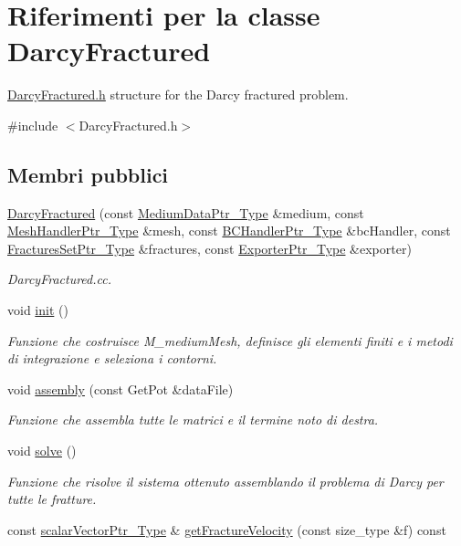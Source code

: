\hypertarget{classDarcyFractured}{\section{Riferimenti per la classe Darcy\-Fractured}
\label{classDarcyFractured}
}


\hyperlink{DarcyFractured_8h}{Darcy\-Fractured.\-h} structure for the Darcy fractured problem.  




{\ttfamily \#include $<$Darcy\-Fractured.\-h$>$}

\subsection*{Membri pubblici}
\begin{DoxyCompactItemize}
\item 
\hyperlink{classDarcyFractured_accc03f979ab787754e26d9f06b553c96}{Darcy\-Fractured} (const \hyperlink{MediumData_8h_ab4e5446269b79f019405fbe1b6e4b1fe}{Medium\-Data\-Ptr\-\_\-\-Type} \&medium, const \hyperlink{MeshHandler_8h_a1e5fc39dfda19e81b21756ab7719ef4c}{Mesh\-Handler\-Ptr\-\_\-\-Type} \&mesh, const \hyperlink{BCHandler_8h_aa175884cb453788647f17f2230a2a762}{B\-C\-Handler\-Ptr\-\_\-\-Type} \&bc\-Handler, const \hyperlink{FracturesSet_8h_ac29a2a91d3af77fb459980a7db47f420}{Fractures\-Set\-Ptr\-\_\-\-Type} \&fractures, const \hyperlink{Exporter_8h_ac9d7f94fea8b91459a536bfaa2f3910c}{Exporter\-Ptr\-\_\-\-Type} \&exporter)
\begin{DoxyCompactList}\small\item\em Darcy\-Fractured.\-cc. \end{DoxyCompactList}\item 
void \hyperlink{classDarcyFractured_a7832c9317b9764da96fc8ee112860824}{init} ()
\begin{DoxyCompactList}\small\item\em Funzione che costruisce M\-\_\-medium\-Mesh, definisce gli elementi finiti e i metodi di integrazione e seleziona i contorni. \end{DoxyCompactList}\item 
void \hyperlink{classDarcyFractured_a7af785ff47dda6db2bcc0846c47877c1}{assembly} (const Get\-Pot \&data\-File)
\begin{DoxyCompactList}\small\item\em Funzione che assembla tutte le matrici e il termine noto di destra. \end{DoxyCompactList}\item 
void \hyperlink{classDarcyFractured_a074b6ec717f783c731b2be89f6528cc0}{solve} ()
\begin{DoxyCompactList}\small\item\em Funzione che risolve il sistema ottenuto assemblando il problema di Darcy per tutte le fratture. \end{DoxyCompactList}\item 
const \hyperlink{Core_8h_ab09b6fa3c23db1b8c60456f8690c44a7}{scalar\-Vector\-Ptr\-\_\-\-Type} \& \hyperlink{classDarcyFractured_a7ea359d5998a00804db8fc1ae1f4739a}{get\-Fracture\-Velocity} (const size\-\_\-type \&f) const 
\end{DoxyCompactItemize}


